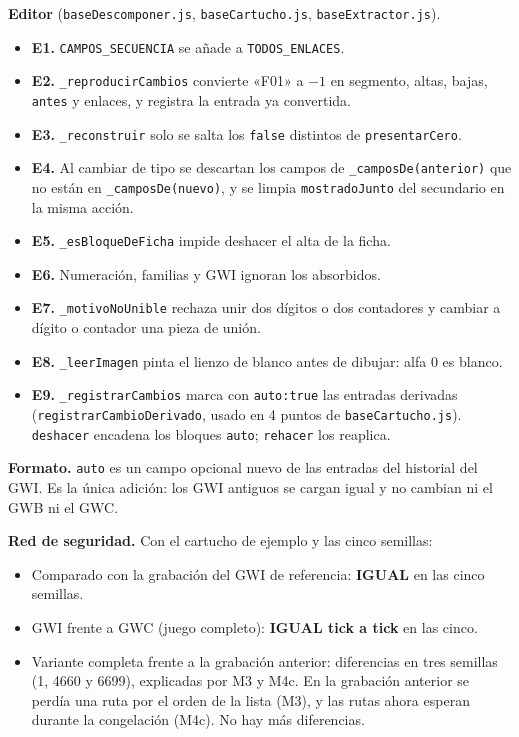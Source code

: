 \textbf{Editor} (\texttt{baseDescomponer.js}, \texttt{baseCartucho.js}, \texttt{baseExtractor.js}).
\begin{itemize}
	\item \textbf{E1.} \texttt{CAMPOS\_SECUENCIA} se añade a \texttt{TODOS\_ENLACES}.
	\item \textbf{E2.} \texttt{\_reproducirCambios} convierte «F01» a $-1$ en segmento, altas, bajas, \texttt{antes} y enlaces, y registra la entrada ya convertida.
	\item \textbf{E3.} \texttt{\_reconstruir} solo se salta los \texttt{false} distintos de \texttt{presentarCero}.
	\item \textbf{E4.} Al cambiar de tipo se descartan los campos de \texttt{\_camposDe(anterior)} que no están en \texttt{\_camposDe(nuevo)}, y se limpia \texttt{mostradoJunto} del secundario en la misma acción.
	\item \textbf{E5.} \texttt{\_esBloqueDeFicha} impide deshacer el alta de la ficha.
	\item \textbf{E6.} Numeración, familias y GWI ignoran los absorbidos.
	\item \textbf{E7.} \texttt{\_motivoNoUnible} rechaza unir dos dígitos o dos contadores y cambiar a dígito o contador una pieza de unión.
	\item \textbf{E8.} \texttt{\_leerImagen} pinta el lienzo de blanco antes de dibujar: alfa 0 es blanco.
	\item \textbf{E9.} \texttt{\_registrarCambios} marca con \texttt{auto:true} las entradas derivadas (\texttt{registrarCambioDerivado}, usado en 4 puntos de \texttt{baseCartucho.js}). \texttt{deshacer} encadena los bloques \texttt{auto}; \texttt{rehacer} los reaplica.
\end{itemize}

\textbf{Formato.} \texttt{auto} es un campo opcional nuevo de las entradas del historial del GWI. Es la única adición: los GWI antiguos se cargan igual y no cambian ni el GWB ni el GWC.

\textbf{Red de seguridad.} Con el cartucho de ejemplo y las cinco semillas:
\begin{itemize}
	\item Comparado con la grabación del GWI de referencia: \textbf{IGUAL} en las cinco semillas.
	\item GWI frente a GWC (juego completo): \textbf{IGUAL tick a tick} en las cinco.
	\item Variante completa frente a la grabación anterior: diferencias en tres semillas (1, 4660 y 6699), explicadas por M3 y M4c. En la grabación anterior se perdía una ruta por el orden de la lista (M3), y las rutas ahora esperan durante la congelación (M4c). No hay más diferencias.
\end{itemize}

